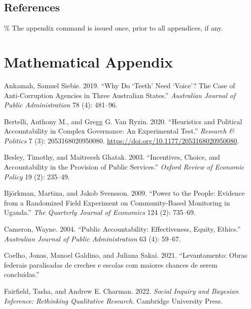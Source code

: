 \documentclass[]{AEA}
\newlength{\cslhangindent}
\newlength{\cslentryspacingunit} %
\newenvironment{CSLReferences}[2] %
 {%
  \setlength{\parindent}{0pt}
  \ifodd #1
  \let\oldpar\par
  \def\par{\hangindent=\cslhangindent\oldpar}
  \fi
  \setlength{\parskip}{#2\cslentryspacingunit}
 }%
 {}
\begin{document}
\hypertarget{references}{%
\subsection{References}\label{references}}




\% The appendix command is issued once, prior to all appendices, if any.
\appendix

\section{Mathematical Appendix}

\hypertarget{refs}{}
\begin{CSLReferences}{1}{0}
\leavevmode{}%
Ankamah, Samuel Siebie. 2019. {``Why Do {`Teeth'} Need {`Voice'}? {The}
Case of Anti-Corruption Agencies in Three {Australian} States.''}
\emph{Australian Journal of Public Administration} 78 (4): 481--96.

\leavevmode{}%
Bertelli, Anthony M., and Gregg G. Van Ryzin. 2020. {``Heuristics and
Political Accountability in Complex Governance: {An} Experimental
Test.''} \emph{Research \& Politics} 7 (3): 2053168020950080.
\url{https://doi.org/10.1177/2053168020950080}.

\leavevmode{}%
Besley, Timothy, and Maitreesh Ghatak. 2003. {``Incentives, Choice, and
Accountability in the Provision of Public Services.''} \emph{Oxford
Review of Economic Policy} 19 (2): 235--49.

\leavevmode{}%
Björkman, Martina, and Jakob Svensson. 2009. {``Power to the People:
Evidence from a Randomized Field Experiment on Community-Based
Monitoring in {Uganda}.''} \emph{The Quarterly Journal of Economics} 124
(2): 735--69.

\leavevmode{}%
Cameron, Wayne. 2004. {``Public Accountability: {Effectiveness}, Equity,
Ethics.''} \emph{Australian Journal of Public Administration} 63 (4):
59--67.

\leavevmode{}%
Coelho, Jonas, Manoel Galdino, and Juliana Sakai. 2021.
{``{Levantamento: Obras federais paralisadas de creches e escolas com
maiores chances de serem concluídas}.''}

\leavevmode{}%
Fairfield, Tasha, and Andrew E. Charman. 2022. \emph{Social Inquiry and
{Bayesian} Inference: {Rethinking} Qualitative Research}. {Cambridge
University Press}.


\end{CSLReferences}
\end{document}
